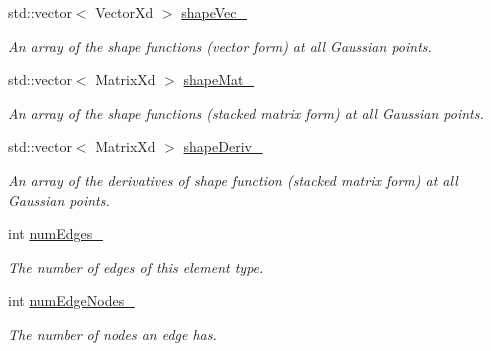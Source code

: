 \begin{DoxyCompactItemize}
\mbox{\label{class_shape_ab20d7fb49963b09d1c294f28c6e5295b}} 
std\+::vector$<$ Vector\+Xd $>$ \mbox{\hyperlink{class_shape_ab20d7fb49963b09d1c294f28c6e5295b}{shape\+Vec\+\_\+}}
\begin{DoxyCompactList}\small\item\em An array of the shape functions (vector form) at all Gaussian points. \end{DoxyCompactList}\item 
\mbox{\label{class_shape_a9eab26923dfc3dbe90dbcab164e63f28}} 
std\+::vector$<$ Matrix\+Xd $>$ \mbox{\hyperlink{class_shape_a9eab26923dfc3dbe90dbcab164e63f28}{shape\+Mat\+\_\+}}
\begin{DoxyCompactList}\small\item\em An array of the shape functions (stacked matrix form) at all Gaussian points. \end{DoxyCompactList}\item 
\mbox{\label{class_shape_a11bf0927166d002fb730889275d608ea}} 
std\+::vector$<$ Matrix\+Xd $>$ \mbox{\hyperlink{class_shape_a11bf0927166d002fb730889275d608ea}{shape\+Deriv\+\_\+}}
\begin{DoxyCompactList}\small\item\em An array of the derivatives of shape function (stacked matrix form) at all Gaussian points. \end{DoxyCompactList}\item 
\mbox{\label{class_shape_a48cc39a592761dce468c50c9bf0d77fe}} 
int \mbox{\hyperlink{class_shape_a48cc39a592761dce468c50c9bf0d77fe}{num\+Edges\+\_\+}}
\begin{DoxyCompactList}\small\item\em The number of edges of this element type. \end{DoxyCompactList}\item 
\mbox{\label{class_shape_a0de5974df65f16f324f3c1f3fcfaee81}} 
int \mbox{\hyperlink{class_shape_a0de5974df65f16f324f3c1f3fcfaee81}{num\+Edge\+Nodes\+\_\+}}
\begin{DoxyCompactList}\small\item\em The number of nodes an edge has. \end{DoxyCompactList}\item 
\mbox{\label{class_shape_a5834a3c81b025002ff7325c7e030f2cf}} 

\end{DoxyCompactItemize}

